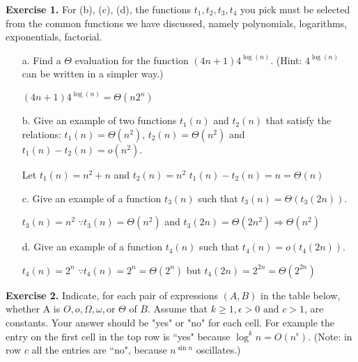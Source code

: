 \documentclass[12pt,letterpaper,final]{report}
\begin{document}
\vline


\textbf{Exercise 1.} For (b), (c), (d), the functions $t_1, t_2, t_3, t_4$ you pick must be selected from the common functions we have discussed, namely polynomials, logarithms, exponentials, factorial.
\begin{enumerate}
\item[a.]   Find a $\Theta$ evaluation for the function $(4n + 1) 4^{\log(n)}$. (Hint:  $4^{\log(n)}$ can be written in a simpler way.)

    $(4n+1)4^{\log{(n)}} = \Theta(n2^n)$
    
\item[b.]  Give an example of two functions $t_1(n)$ and $t_2(n)$ that satisfy the relations:   $t_1(n) = \Theta(n^2)$, $t_2(n) = \Theta(n^2)$ and $t_1(n) - t_2(n) = o(n^2)$.

    Let $t_1(n) = n^2 + n$ and $t_2(n) = n^2$
    $t_1(n)-t_2(n) = n = \Theta(n)$

\item[c.]  Give an example of a function $t_3(n)$ such that $t_3(n) = \Theta(t_3(2n))$.

    $t_3(n) = n^2$\newline
    $\because t_3(n) = \Theta(n^2)$ and $t_3(2n) = \Theta(2n^2) \Rightarrow \Theta(n^2)$

\item[d.]   Give an example of a function $t_4(n)$ such that $t_4(n) = o(t_4(2n))$.

    $t_4(n) = 2^n$\newline
    $\because t_4(n) = 2^n = \Theta(2^n)$ but $t_4(2n) = 2^{2n} = \Theta(2^{2n})$
\end{enumerate}
\bigskip



\textbf{Exercise 2.}    Indicate, for each pair of expressions $(A, B)$ in the table below, whether A is $O, o, \Omega, \omega, \text{or } 
\Theta$ of $B$. Assume that $k \geq 1, \epsilon > 0 \text{ and } c > 1$, are constants. Your answer should be "yes" or "no" for each cell. For example the entry on the first cell in the top row is ``yes" because $\log^k n = O(n^\epsilon)$.  (Note: in row $c$ all the entries are ``no", because $n^{\sin n}$ oscillates.)
\end{document}
